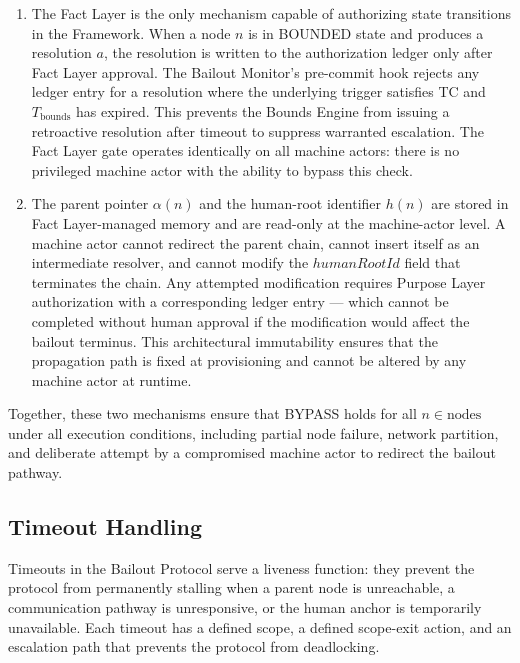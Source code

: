 \begin{enumerate}
\item[\textbf{Fact Layer gate (enforcement at the authorization layer).}] The Fact Layer is the only mechanism capable of authorizing state transitions in the \bxthree{} Framework. When a node $n$ is in BOUNDED state and produces a resolution $a$, the resolution is written to the authorization ledger only after Fact Layer approval. The Bailout Monitor's pre-commit hook rejects any ledger entry for a resolution where the underlying trigger satisfies TC and $T_{\text{bounds}}$ has expired. This prevents the Bounds Engine from issuing a retroactive resolution after timeout to suppress warranted escalation. The Fact Layer gate operates identically on all machine actors: there is no privileged machine actor with the ability to bypass this check.

\item[\textbf{Immutable parent-pointer and human-root architecture (enforcement at the data model layer).}] The parent pointer $\alpha(n)$ and the human-root identifier $h(n)$ are stored in Fact Layer-managed memory and are read-only at the machine-actor level. A machine actor cannot redirect the parent chain, cannot insert itself as an intermediate resolver, and cannot modify the $humanRootId$ field that terminates the chain. Any attempted modification requires Purpose Layer authorization with a corresponding ledger entry — which cannot be completed without human approval if the modification would affect the bailout terminus. This architectural immutability ensures that the propagation path is fixed at provisioning and cannot be altered by any machine actor at runtime.
\end{enumerate}

Together, these two mechanisms ensure that BYPASS holds for all $n \in \text{nodes}$ under all execution conditions, including partial node failure, network partition, and deliberate attempt by a compromised machine actor to redirect the bailout pathway.

\subsection{Timeout Handling}\label{sec:timeout-handling}

Timeouts in the Bailout Protocol serve a liveness function: they prevent the protocol from permanently stalling when a parent node is unreachable, a communication pathway is unresponsive, or the human anchor is temporarily unavailable. Each timeout has a defined scope, a defined scope-exit action, and an escalation path that prevents the protocol from deadlocking.

